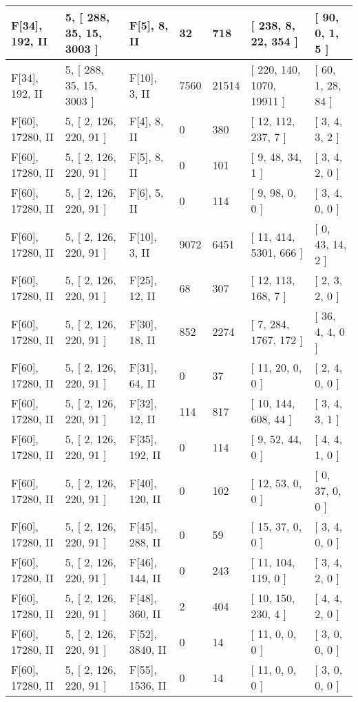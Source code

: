 \documentclass[9 pt]{scrartcl}
\begin{document}
\begin{longtable}{ |p{3em}|p{6em}|p{3em}|p{2em}|p{2em}|p{6em}|p{6em}| }
F[34], 192, II &5, [ 288, 35, 15, 3003 ] & F[5], 8, II  & 32 & 718 & [ 238, 8, 22, 354 ] & [ 90, 0, 1, 5 ]\\ \hline
F[34], 192, II &5, [ 288, 35, 15, 3003 ] & F[10], 3, II  & 7560 & 21514 & [ 220, 140, 1070, 19911 ] & [ 60, 1, 28, 84 ]\\ \hline
F[60], 17280, II &5, [ 2, 126, 220, 91 ] & F[4], 8, II  & 0 & 380 & [ 12, 112, 237, 7 ] & [ 3, 4, 3, 2 ]\\ \hline
F[60], 17280, II &5, [ 2, 126, 220, 91 ] & F[5], 8, II  & 0 & 101 & [ 9, 48, 34, 1 ] & [ 3, 4, 2, 0 ]\\ \hline
F[60], 17280, II &5, [ 2, 126, 220, 91 ] & F[6], 5, II  & 0 & 114 & [ 9, 98, 0, 0 ] & [ 3, 4, 0, 0 ]\\ \hline
F[60], 17280, II &5, [ 2, 126, 220, 91 ] & F[10], 3, II  & 9072 & 6451 & [ 11, 414, 5301, 666 ] & [ 0, 43, 14, 2 ]\\ \hline
F[60], 17280, II &5, [ 2, 126, 220, 91 ] & F[25], 12, II  & 68 & 307 & [ 12, 113, 168, 7 ] & [ 2, 3, 2, 0 ]\\ \hline
F[60], 17280, II &5, [ 2, 126, 220, 91 ] & F[30], 18, II  & 852 & 2274 & [ 7, 284, 1767, 172 ] & [ 36, 4, 4, 0 ]\\ \hline
F[60], 17280, II &5, [ 2, 126, 220, 91 ] & F[31], 64, II  & 0 & 37 & [ 11, 20, 0, 0 ] & [ 2, 4, 0, 0 ]\\ \hline
F[60], 17280, II &5, [ 2, 126, 220, 91 ] & F[32], 12, II  & 114 & 817 & [ 10, 144, 608, 44 ] & [ 3, 4, 3, 1 ]\\ \hline
F[60], 17280, II &5, [ 2, 126, 220, 91 ] & F[35], 192, II  & 0 & 114 & [ 9, 52, 44, 0 ] & [ 4, 4, 1, 0 ]\\ \hline
F[60], 17280, II &5, [ 2, 126, 220, 91 ] & F[40], 120, II  & 0 & 102 & [ 12, 53, 0, 0 ] & [ 0, 37, 0, 0 ]\\ \hline
F[60], 17280, II &5, [ 2, 126, 220, 91 ] & F[45], 288, II  & 0 & 59 & [ 15, 37, 0, 0 ] & [ 3, 4, 0, 0 ]\\ \hline
F[60], 17280, II &5, [ 2, 126, 220, 91 ] & F[46], 144, II  & 0 & 243 & [ 11, 104, 119, 0 ] & [ 3, 4, 2, 0 ]\\ \hline
F[60], 17280, II &5, [ 2, 126, 220, 91 ] & F[48], 360, II  & 2 & 404 & [ 10, 150, 230, 4 ] & [ 4, 4, 2, 0 ]\\ \hline
F[60], 17280, II &5, [ 2, 126, 220, 91 ] & F[52], 3840, II  & 0 & 14 & [ 11, 0, 0, 0 ] & [ 3, 0, 0, 0 ]\\ \hline
F[60], 17280, II &5, [ 2, 126, 220, 91 ] & F[55], 1536, II  & 0 & 14 & [ 11, 0, 0, 0 ] & [ 3, 0, 0, 0 ]\\ \hline

\end{longtable}
\end{document}
